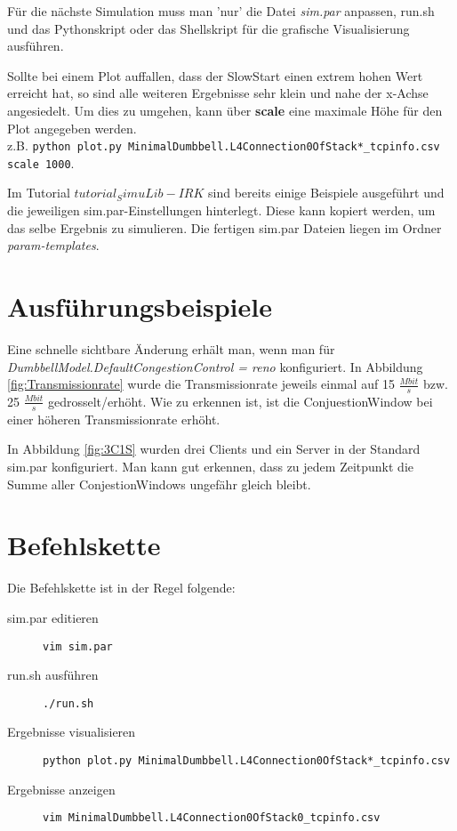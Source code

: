 \documentclass[11pt,div=14]{scrartcl}
\begin{document}
Für die nächste Simulation muss man 'nur' die Datei \textit{sim.par} anpassen, run.sh und das Pythonskript oder das Shellskript für die grafische Visualisierung ausführen.

Sollte bei einem Plot auffallen, dass der SlowStart einen extrem hohen Wert erreicht hat, so sind alle weiteren Ergebnisse sehr klein und nahe der x-Achse angesiedelt. Um dies zu umgehen, kann über \textbf{scale} eine maximale Höhe für den Plot angegeben werden.\\ z.B. \colorbox{lightred}{\lstinline$python plot.py MinimalDumbbell.L4Connection0OfStack*_tcpinfo.csv scale 1000$}.

Im Tutorial \textit{$tutorial_SimuLib-IRK$} sind bereits einige Beispiele ausgeführt und die jeweiligen sim.par-Einstellungen hinterlegt. Diese kann kopiert werden, um das selbe Ergebnis zu simulieren. Die fertigen sim.par Dateien liegen im Ordner \textit{param-templates}.
\section{Ausführungsbeispiele}
\label{Ausführungsbeispiele}
Eine schnelle sichtbare Änderung erhält man, wenn man für \textit{DumbbellModel.DefaultCongestionControl = reno} konfiguriert.
In Abbildung \ref{fig:Transmissionrate} wurde die Transmissionrate jeweils einmal auf 15 $\frac{Mbit}{s}$ bzw. 25 $\frac{Mbit}{s}$  gedrosselt/erhöht. Wie zu erkennen ist, ist die ConjuestionWindow bei einer höheren Transmissionrate erhöht. 

In Abbildung \ref{fig:3C1S} wurden drei Clients und ein Server in der Standard sim.par konfiguriert. Man kann gut erkennen, dass zu jedem Zeitpunkt die Summe aller ConjestionWindows ungefähr gleich bleibt. 


\section{Befehlskette}
\label{Befehlskette}
Die Befehlskette ist in der Regel folgende:
\begin{description}
\item[sim.par editieren] \colorbox{lightred}{\lstinline$vim sim.par$}
\item[run.sh ausführen] \colorbox{lightred}{\lstinline$./run.sh$}
\item[Ergebnisse visualisieren] \colorbox{lightred}{\lstinline$python plot.py MinimalDumbbell.L4Connection0OfStack*_tcpinfo.csv$}
\item[Ergebnisse anzeigen] \colorbox{lightred}{\lstinline$vim MinimalDumbbell.L4Connection0OfStack0_tcpinfo.csv$}
\end{description}
\end{document}
